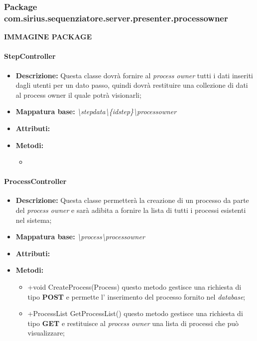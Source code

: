 \subsubsection{Package com.sirius.sequenziatore.server.presenter.processowner}
\textbf{IMMAGINE PACKAGE}
\paragraph{StepController}%
\begin{itemize}
	\item \textbf{Descrizione: } Questa classe dovrà fornire al \textit{process owner} tutti i dati inseriti dagli utenti per un dato passo, quindi dovrà restituire una collezione di dati al process owner il quale potrà visionarli;
	\item \textbf{Mappatura base: } \textit{\textbackslash stepdata\textbackslash \{idstep\}\textbackslash processowner}
	\item \textbf{Attributi: }
	\item \textbf{Metodi: }\begin{itemize}
					\item 
				\end{itemize}
\end{itemize}
\paragraph{ProcessController}%
\begin{itemize}
	\item \textbf{Descrizione: } Questa classe permetterà la creazione di un processo da parte del \textit{process owner} e sarà adibita a fornire la lista di tutti i processi esistenti nel sistema;
	\item \textbf{Mappatura base: } \textit{\textbackslash process\textbackslash processowner}
	\item \textbf{Attributi: }
	\item \textbf{Metodi: }
				\begin{itemize}
					\item +void CreateProcess(Process) questo metodo gestisce una richiesta di tipo \textbf{POST} e permette l' inserimento del processo fornito nel \textit{database};
					\item +ProcessList GetProcessList() questo metodo gestisce una richiesta di tipo \textbf{GET} e restituisce al \textit{process owner} una lista di processi che può visualizzare;
				\end{itemize}
\end{itemize}
